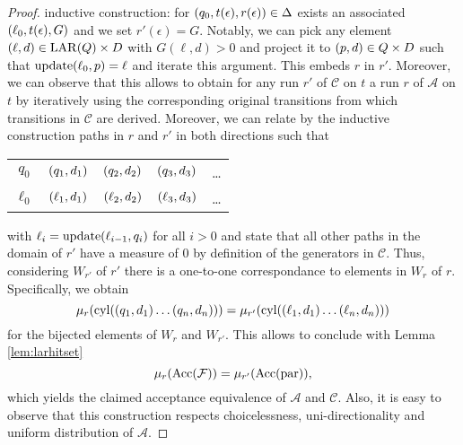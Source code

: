 \begin{proof}
  inductive construction: for $\left(q_{0}, t(\epsilon), r(\epsilon)\right)\in
  \Delta$ exists an associated $\left(\ell_{0}, t(\epsilon), G\right)$ and we set
  $r'(\epsilon) = G$. Notably, we can pick any element 
  $\left(\ell, d\right)\in\operatorname{LAR}(Q)\times D$ with $G(\ell, d) > 0$ and project it to
  $\left(p, d\right)\in Q\times D$ such that $\operatorname{update}(\ell_{0}, p) = \ell$ and iterate
  this argument. This embeds $r$ in $r'$. Moreover, we can observe that this 
  allows to obtain for any run $r'$ of $\mathcal{C}$ on $t$ a run $r$ of 
  $\mathcal{A}$ on $t$ by iteratively using the corresponding original 
  transitions from which transitions in $\mathcal{C}$ are derived. Moreover, 
  we can relate by the inductive construction paths in $r$ and $r'$ in both 
  directions such that
  \begin{center}
    \begin{tabular}{ccccc}
      $q_{0}$ & $\left(q_{1}, d_{1}\right)$ & $\left(q_{2}, d_{2}\right)$ & 
        $\left(q_{3}, d_{3}\right)$ & \dots\\
      $\ell_{0}$ & $\left(\ell_{1}, d_{1}\right)$ & $\left(\ell_{2}, d_{2}\right)$ & 
        $\left(\ell_{3}, d_{3}\right)$ & \dots
    \end{tabular}
  \end{center}
  with $\ell_{i} = \operatorname{update}(\ell_{i-1}, q_{i})$ for all $i>0$ and state that all 
  other paths in the domain of $r'$ have a measure of $0$ by definition of the
  generators in $\mathcal{C}$. Thus, considering $W_{r'}$ of $r'$ there is a 
  one-to-one correspondance to elements in $W_{r}$ of $r$. Specifically, we 
  obtain
  \begin{equation*}
    \mu_{r}(\operatorname{cyl}(\left(q_{1},d_{1}\right)\dots\left(q_{n},d_{n}\right))) = 
      \mu_{r'}(\operatorname{cyl}(\left(\ell_{1},d_{1}\right)\dots\left(\ell_{n},d_{n}\right)))
  \end{equation*}
  for the bijected elements of $W_{r}$ and $W_{r'}$. This allows to conclude 
  with Lemma \ref{lem:larhitset}
  \begin{equation*}
    \mu_{r}(\operatorname{Acc}(\mathcal{F})) = \mu_{r'}(\operatorname{Acc}(\operatorname{par})),
  \end{equation*} 
  which yields the claimed acceptance equivalence of $\mathcal{A}$ and 
  $\mathcal{C}$. Also, it is easy to observe that this construction respects
  choicelessness, uni-directionality and uniform distribution of $\mathcal{A}$.
\end{proof}

